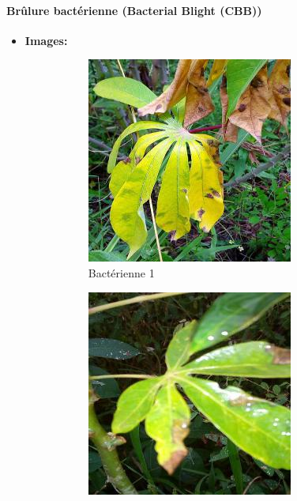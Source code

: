 \documentclass{article}
\begin{document}
		\paragraph{Brûlure bactérienne (Bacterial Blight (CBB))}
		\begin{itemize}
			\item \textbf{Images: }
			\begin{figure}[htbp]
				\centering
				\begin{subfigure}[b]{0.3\textwidth}
					\centering
					\includegraphics[width=\textwidth]{img/1.jpg}
					\caption{Bactérienne 1}
				\end{subfigure}
				\hfill
				\begin{subfigure}[b]{0.3\textwidth}
					\centering
					\includegraphics[width=\textwidth]{img/2.jpg}

\end{subfigure}
\end{figure}
\end{itemize}
\end{document}
